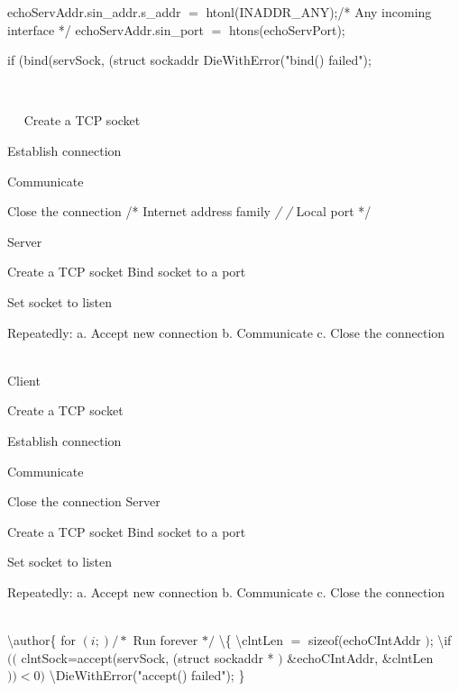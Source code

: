 \begin{description}
echoServAddr.sin\_addr.s\_addr $=$ htonl(INADDR\_ANY);/* Any incoming interface */ echoServAddr.sin\_port $=$ htons(echoServPort);

if (bind(servSock, (struct sockaddr DieWithError("bind() failed");


\os{\newpage}\item[{\rot\bf  Client }]~\\[-3ex]

\begin{enumerate}
  \ite $\quad$ Create a TCP socket

  \ite Establish connection

  \ite Communicate

  \ite Close the connection /* Internet address family \textit{/ /} Local port */

\end{enumerate}

Server

Create a TCP socket Bind socket to a port

Set socket to listen

Repeatedly:
a. Accept new connection
b. Communicate
c. Close the connection


\item[{\rot\bf  TCP Client/Server Interaction  }]~\\[-3ex]

Client

\begin{enumerate}
  \ite Create a TCP socket

  \ite Establish connection

  \ite Communicate

  \ite Close the connection Server

\end{enumerate}

Create a TCP socket Bind socket to a port

Set socket to listen

Repeatedly:
a. Accept new connection
b. Communicate
c. Close the connection


\item[{\rot\bf  TCP Client/Server Interaction  }]~\\[-3ex]

\textbackslash author\{
for $(i ;) / *$ Run forever $* /$ \textbackslash  \{ \textbackslash  clntLen $=$ sizeof(echoCIntAddr $)$; \textbackslash  if $(($ clntSock=accept(servSock, (struct sockaddr * $)$ \&echoCIntAddr, \&clntLen $))<0)$ \textbackslash  DieWithError("accept() failed");
\}



\end{description}
